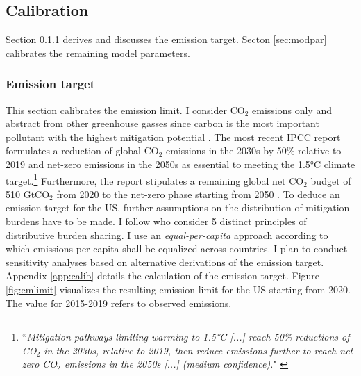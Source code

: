 \subsection{Calibration}\label{sec:calib2}

Section \ref{sec:ems} derives and discusses the emission target. 
Secton \ref{sec:modpar} calibrates the remaining model parameters.

\subsubsection{Emission target}\label{sec:ems}
This section calibrates the emission limit. I consider CO$_2$ emissions only and abstract from other greenhouse gasses since carbon is the most important pollutant with the highest mitigation potential \citep[p.29]{IPCC2022}.
The most recent IPCC report \citep{IPCC2022} formulates a reduction of global CO$_2$ emissions in the 2030s by 50\% relative to 2019 and net-zero emissions in the 2050s  as essential to meeting the 1.5°C climate target.\footnote{ ``\textit{Mitigation pathways limiting warming to 1.5°C [...] reach 50\% reductions of CO$_2$ in the 2030s, relative to 2019, then reduce emissions further to reach net zero CO$_2$ emissions in the 2050s [...] (\textnormal{medium confidence}).}" \citep[p.5, Chapter 3]{IPCC2022} }  Furthermore, the report stipulates a remaining global net CO$_2$ budget of 510 GtCO$_2$ %
from 2020 to the net-zero phase starting from 2050 \citep[p.5, Chapter 3]{IPCC2022}. 
To deduce an emission target for the US, further assumptions on the distribution of mitigation burdens have to be made. I follow \cite{RobiouDuPont2017EquitableGoals} who consider 5 distinct principles of distributive burden sharing. I use an \textit{equal-per-capita} approach according to which emissions per capita shall be equalized across countries. 
I plan to conduct sensitivity analyses based on alternative derivations of the emission target. Appendix \ref{app:calib} details the calculation of the emission target. 
Figure \ref{fig:emlimit}  visualizes the resulting emission limit for the US starting from 2020. The value for 2015-2019 refers to observed emissions.

